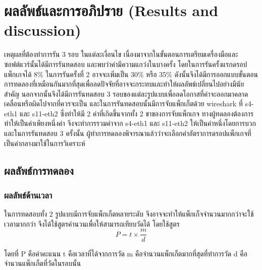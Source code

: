 \section{ผลลัพธ์และการอภิปราย (Results and discussion)}
เหตุผลที่ต้องทำการรัน 3 รอบ ในแต่ละเงื่อนไข เนื่องมาจากในขั้นตอนการเตรียมเครื่องมือและซอฟต์แวร์นั้นได้มีการรันทดสอบ และพบว่าค่ามีความแกว่งในบางครั้ง โดยในการรันครั้งแรกดรอปแพ็กเกจได้ 8\% ในการรันครั้งที่ 2 อาจจะเพิ่มเป็น 30\% หรือ 35\% 
ดังนั้นจึงได้มีการออกแบบขั้นตอนการทดลองที่เหมือนกันมากที่สุดเพื่อลดปัจจัยที่อาจจะกระทบและทำให้ผลลัพธ์เปลี่ยนไปอย่างมีนัยสำคัญ นอกจากนั้นจึงได้มีการรันทดสอบ 3 รอบของแต่ละรูปแบบเพื่อลดโอกาสที่ค่าจะออกมาคลาดเคลื่อนหรือผิดไปจากที่ควรจะเป็น 
และในการรันทดสอบนั้นมีการจับแพ็กเก็ตด้วย wireshark ที่ s4-eth1 และ s11-eth2 ซึ่งทำให้มี 2 ค่าที่เกิดขึ้นจากทั้ง 2 ขาของการจับแพ็กเกจ ทางผู้ทดลองต้องการทำให้เป็นค่าเพียงหนึ่งค่า
จึงจะทำการรวมค่าจาก s4-eth1 และ s11-eth2 ให้เป็นค่าหนึ่งโดยการบวก และในการรันทดสอบ 3 ครั้งนั้น 
ผู้ทำการทดลองพิจารณาแล้วว่าจะเลือกค่าอัตราการดรอปแพ็กเกจที่เป็นค่ากลางมาใช้ในการวิเคราะห์
\\
\subsection{ผลลัพธ์การทดลอง}
\subsubsection*{ผลลัพธ์ด้านเวลา}

%
%
ในการทดสอบทั้ง 2 รูปแบบมีการจับแพ็กเก็ตหลายระดับ จึงอาจจะทำให้แพ็กเก็จจำนวนมากกว่าจะใช้เวลามากกว่า
จึงได้ใช้สูตรคำนวนเพื่อให้สามารถเทียบวัดได้ โดยใช้สูตร
$$P=t \times \frac{m}{d}$$

โดยที่ P คือค่าคะแนน t คือเวลาที่ได้จากการวัด m คือจำนวนแพ็กเก็ตมากที่สุดที่ทำการวัด d คือจำนวนแพ็กเก็ตที่วัดในรอบนั้น

